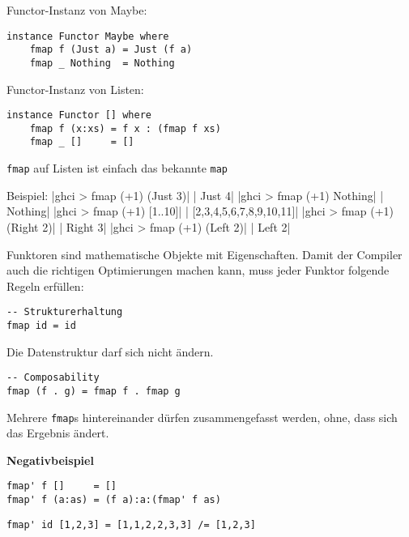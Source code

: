 \documentclass{beamer}
\begin{document}
\begin{frame}[fragile]
Functor-Instanz von Maybe:
\begin{verbatim}
instance Functor Maybe where
    fmap f (Just a) = Just (f a)
    fmap _ Nothing  = Nothing
\end{verbatim}
\begin{comment}
\pause
Functor-Instanz von Either:
\begin{verbatim}
instance Functor Either where
    fmap f (Right a) = Right (f a)
    fmap _ (Left b)  = Left b
\end{verbatim}
\end{comment}
\pause
Functor-Instanz von Listen:
\begin{verbatim}
instance Functor [] where
    fmap f (x:xs) = f x : (fmap f xs)
    fmap _ []     = []
\end{verbatim}
\texttt{fmap} auf Listen ist einfach das bekannte \texttt{map}
\end{frame}


\begin{frame}[fragile]
Beispiel:
|ghci > fmap (+1) (Just 3)|
\pause
{}|       Just 4|
|ghci > fmap (+1) Nothing|
\pause
{}|       Nothing|
|ghci > fmap (+1) [1..10]|
\pause
{}|       [2,3,4,5,6,7,8,9,10,11]|
|ghci > fmap (+1) (Right 2)|
\pause
{}|       Right 3|
|ghci > fmap (+1) (Left 2)|
\pause
{}|       Left 2|
\end{frame}

\begin{frame}[fragile]
Funktoren sind mathematische Objekte mit Eigenschaften. Damit der Compiler auch die richtigen Optimierungen machen kann, muss jeder Funktor folgende Regeln erfüllen:\\
\pause
\begin{verbatim}
-- Strukturerhaltung
fmap id = id
\end{verbatim}
Die Datenstruktur darf sich nicht ändern.\\
\pause
\bigskip
\begin{verbatim}
-- Composability
fmap (f . g) = fmap f . fmap g
\end{verbatim}
Mehrere \texttt{fmap}s hintereinander dürfen zusammengefasst werden, ohne, dass sich das Ergebnis ändert.
\end{frame}

\begin{frame}[fragile]
\begin{important}\begin{center}\textbf{Negativbeispiel}\end{center}\end{important}
\begin{verbatim}
fmap' f []     = []
fmap' f (a:as) = (f a):a:(fmap' f as)
\end{verbatim}
\pause
\begin{verbatim}
fmap' id [1,2,3] = [1,1,2,2,3,3] /= [1,2,3]
\end{verbatim}
\end{frame}
\end{document}
